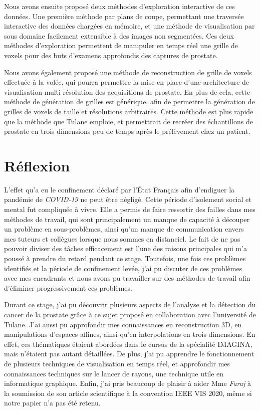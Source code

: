 {{        Nous avons ensuite proposé deux méthodes d'exploration interactive de ces données. Une première méthode par plans de coupe, permettant une traversée interactive des données chargées en mémoire, et une méthode de visualisation par sous domaine facilement extensible à des images non segmentées. Ces deux méthodes d'exploration permettent de manipuler en temps réel une grille de voxels pour des buts d'examens approfondis des captures de prostate.

        Nous avons également proposé une méthode de reconstruction de grille de voxels effectuée à la volée, qui pourra permettre la mise en place d'une architecture de visualisation multi-résolution des acquisitions de prostate. En plus de cela, cette méthode de génération de grilles est générique, afin de permettre la génération de grilles de voxels de taille et résolutions arbitraires. Cette méthode est plus rapide que la méthode que Tulane emploie, et permettrait de recréer des échantillons de prostate en trois dimensions peu de temps après le prélèvement chez un patient.
	}

	\section{Réflexion}
	{
        L'effet qu'a eu le confinement déclaré par l'\'Etat Français afin d'endiguer la pandémie de \textit{COVID-19} ne peut être négligé. Cette période d'isolement social et mental fut compliquée à vivre. Elle a permis de faire ressortir des failles dans mes méthodes de travail, qui sont principalement un manque de capacité à découper un problème en sous-problèmes, ainsi qu'un manque de communication envers mes tuteurs et collègues lorsque nous sommes en distanciel. Le fait de ne pas pouvoir diviser des tâches efficacement est l'une des raisons principales qui m'a poussé à prendre du retard pendant ce stage. Toutefois, une fois ces problèmes identifiés et la période de confinement levée, j'ai pu discuter de ces problèmes avec mes encadrants et nous avons pu travailler sur des méthodes de travail afin d'éliminer progressivement ces problèmes.

		Durant ce stage, j'ai pu découvrir plusieurs aspects de l'analyse et la détection du cancer de la prostate grâce à ce sujet proposé en collaboration avec l'université de Tulane. J'ai aussi pu approfondir mes connaissances en reconstruction 3D, en manipulations d'espaces affines, ainsi qu'en interpolations en trois dimensions. En effet, ces thématiques étaient abordées dans le cursus de la spécialité IMAGINA, mais n'étaient pas autant détaillées. De plus, j'ai pu apprendre le fonctionnement de plusieurs techniques de visualisation en temps réel, et approfondir mes connaissances techniques sur le lancer de rayons, une technique utile en informatique graphique. Enfin, j'ai pris beaucoup de plaisir à aider Mme \textit{Faraj} à la soumission de son article scientifique à la convention IEEE VIS 2020, même si notre papier n'a pas été retenu.
	}

}
